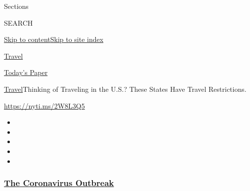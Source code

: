 Sections

SEARCH

\protect\hyperlink{site-content}{Skip to
content}\protect\hyperlink{site-index}{Skip to site index}

\href{https://www.nytimes3xbfgragh.onion/section/travel}{Travel}

\href{https://myaccount.nytimes3xbfgragh.onion/auth/login?response_type=cookie\&client_id=vi}{}

\href{https://www.nytimes3xbfgragh.onion/section/todayspaper}{Today's
Paper}

\href{/section/travel}{Travel}\textbar{}Thinking of Traveling in the
U.S.? These States Have Travel Restrictions.

\url{https://nyti.ms/2W8L3Q5}

\begin{itemize}
\item
\item
\item
\item
\item
\end{itemize}

\hypertarget{the-coronavirus-outbreak}{%
\subsubsection{\texorpdfstring{\href{https://www.nytimes3xbfgragh.onion/news-event/coronavirus?name=styln-coronavirus-national\&region=TOP_BANNER\&block=storyline_menu_recirc\&action=click\&pgtype=Article\&impression_id=43485f20-f1c1-11ea-b492-3b10163695e2\&variant=undefined}{The
Coronavirus
Outbreak}}{The Coronavirus Outbreak}}\label{the-coronavirus-outbreak}}

